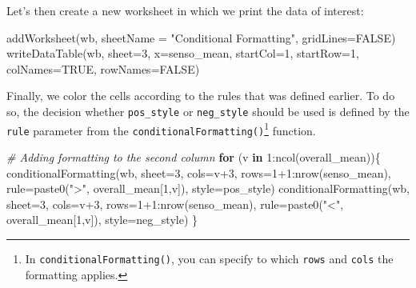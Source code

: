 \documentclass[
]{krantz}
\makeatletter
\newenvironment{Shaded}{\begin{snugshade}}{\end{snugshade}}
\newcommand{\AttributeTok}[1]{\textcolor[rgb]{0.61,0.61,0.61}{#1}}
\newcommand{\CommentTok}[1]{\textcolor[rgb]{0.37,0.37,0.37}{\textit{#1}}}
\newcommand{\ConstantTok}[1]{\textcolor[rgb]{0,0,0}{#1}}
\newcommand{\ControlFlowTok}[1]{\textcolor[rgb]{0.27,0.27,0.27}{\textbf{#1}}}
\newcommand{\DecValTok}[1]{\textcolor[rgb]{0.06,0.06,0.06}{#1}}
\newcommand{\FunctionTok}[1]{\textcolor[rgb]{0,0,0}{#1}}
\newcommand{\NormalTok}[1]{#1}
\newcommand{\SpecialCharTok}[1]{\textcolor[rgb]{0,0,0}{#1}}
\newcommand{\StringTok}[1]{\textcolor[rgb]{0.5,0.5,0.5}{#1}}
\newenvironment{kframe}{%
\medskip{}
\setlength{\fboxsep}{.8em}
 \def\at@end@of@kframe{}%
 \ifinner\ifhmode%
  \def\at@end@of@kframe{\end{minipage}}%
  \begin{minipage}{\columnwidth}%
 \fi\fi%
 \def\FrameCommand##1{\hskip\@totalleftmargin \hskip-\fboxsep
 \colorbox{shadecolor}{##1}\hskip-\fboxsep
     \hskip-\linewidth \hskip-\@totalleftmargin \hskip\columnwidth}%
 \MakeFramed {\advance\hsize-\width
   \@totalleftmargin\z@ \linewidth\hsize
   \@setminipage}}%
 {\par\unskip\endMakeFramed%
 \at@end@of@kframe}
\renewenvironment{Shaded}{\begin{kframe}}{\end{kframe}}
\makeatother
\begin{document}
Let's then create a new worksheet in which we print the data of interest:

\begin{Shaded}
\begin{Highlighting}[]
\FunctionTok{addWorksheet}\NormalTok{(wb, }\AttributeTok{sheetName =} \StringTok{"Conditional Formatting"}\NormalTok{, }\AttributeTok{gridLines=}\ConstantTok{FALSE}\NormalTok{)}
\FunctionTok{writeDataTable}\NormalTok{(wb, }\AttributeTok{sheet=}\DecValTok{3}\NormalTok{, }\AttributeTok{x=}\NormalTok{senso\_mean, }
               \AttributeTok{startCol=}\DecValTok{1}\NormalTok{, }\AttributeTok{startRow=}\DecValTok{1}\NormalTok{, }\AttributeTok{colNames=}\ConstantTok{TRUE}\NormalTok{, }\AttributeTok{rowNames=}\ConstantTok{FALSE}\NormalTok{)}
\end{Highlighting}
\end{Shaded}

Finally, we color the cells according to the rules that was defined earlier. To do so, the decision whether \texttt{pos\_style} or \texttt{neg\_style} should be used is defined by the \texttt{rule} parameter from the \texttt{conditionalFormatting()}\footnote{In \texttt{conditionalFormatting()}, you can specify to which \texttt{rows} and \texttt{cols} the formatting applies.} function.

\begin{Shaded}
\begin{Highlighting}[]
\CommentTok{\# Adding formatting to the second column}
\ControlFlowTok{for}\NormalTok{ (v }\ControlFlowTok{in} \DecValTok{1}\SpecialCharTok{:}\FunctionTok{ncol}\NormalTok{(overall\_mean))\{}
  \FunctionTok{conditionalFormatting}\NormalTok{(wb, }\AttributeTok{sheet=}\DecValTok{3}\NormalTok{, }\AttributeTok{cols=}\NormalTok{v}\SpecialCharTok{+}\DecValTok{3}\NormalTok{, }
                        \AttributeTok{rows=}\DecValTok{1}\SpecialCharTok{+}\DecValTok{1}\SpecialCharTok{:}\FunctionTok{nrow}\NormalTok{(senso\_mean), }
                        \AttributeTok{rule=}\FunctionTok{paste0}\NormalTok{(}\StringTok{"\textgreater{}"}\NormalTok{, overall\_mean[}\DecValTok{1}\NormalTok{,v]), }
                        \AttributeTok{style=}\NormalTok{pos\_style)}
  \FunctionTok{conditionalFormatting}\NormalTok{(wb, }\AttributeTok{sheet=}\DecValTok{3}\NormalTok{, }\AttributeTok{cols=}\NormalTok{v}\SpecialCharTok{+}\DecValTok{3}\NormalTok{, }
                        \AttributeTok{rows=}\DecValTok{1}\SpecialCharTok{+}\DecValTok{1}\SpecialCharTok{:}\FunctionTok{nrow}\NormalTok{(senso\_mean), }
                        \AttributeTok{rule=}\FunctionTok{paste0}\NormalTok{(}\StringTok{"\textless{}"}\NormalTok{, overall\_mean[}\DecValTok{1}\NormalTok{,v]), }
                        \AttributeTok{style=}\NormalTok{neg\_style)}
\NormalTok{\}}
\end{Highlighting}
\end{Shaded}
\end{document}
